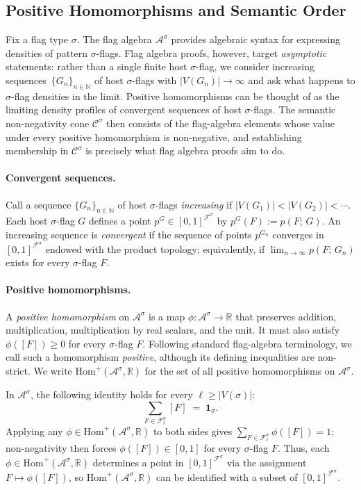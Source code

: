 \documentclass{article}
\newcommand{\poshom}[1]{\mathrm{Hom}^+(\mathcal{A}^{#1}, \mathbb{R})}
\newcommand{\den}[2]{p(#1;\,#2)}
\begin{document}
\subsection{Positive Homomorphisms and Semantic Order}
\label{sec:background-semantic-order}

Fix a flag type $\sigma$.  
The flag algebra $\mathcal{A}^\sigma$ provides algebraic syntax for expressing
densities of pattern $\sigma$-flags.  Flag algebra proofs, however, target
\emph{asymptotic} statements: rather than a single finite host $\sigma$-flag, we
consider increasing sequences~$\{G_n\}_{n\in\mathbb{N}}$ of host
$\sigma$-flags with $|V(G_n)|\to\infty$ and ask what happens to $\sigma$-flag
densities in the limit.  Positive homomorphisms can be thought of as the
limiting density profiles of convergent sequences of host $\sigma$-flags.
The semantic non-negativity cone
$\mathcal{C}^\sigma$ then consists of the flag-algebra elements
whose value under every positive homomorphism is non-negative, and establishing
membership in $\mathcal{C}^\sigma$ is precisely what flag algebra proofs aim
to do.

\paragraph{Convergent sequences.}
Call a sequence $\{G_n\}_{n\in\mathbb{N}}$ of host $\sigma$-flags \emph{increasing} if
$|V(G_1)| < |V(G_2)| < \cdots$.  Each host $\sigma$-flag $G$ defines a point
$p^G \in [0,1]^{\mathcal{F}^\sigma}$ by $p^G(F) := \den{F}{G}$.
An increasing sequence is \emph{convergent} if the sequence of points $p^{G_n}$
converges in $[0,1]^{\mathcal{F}^\sigma}$ endowed with the product topology;
equivalently, if $\lim_{n\to\infty}\den{F}{G_n}$ exists for every $\sigma$-flag $F$.

\paragraph{Positive homomorphisms.}
A \emph{positive homomorphism} on
$\mathcal{A}^\sigma$ is a map
$\phi:\mathcal{A}^\sigma \to \mathbb{R}$ that preserves addition,
multiplication, multiplication by real scalars, and the unit.  It must also
satisfy $\phi([F]) \geq 0$ for every $\sigma$-flag $F$.
Following standard flag-algebra terminology, we call such a homomorphism
\emph{positive}, although its defining inequalities are non-strict.
We write $\poshom{\sigma}$ for the set of all positive homomorphisms on
$\mathcal{A}^\sigma$.

In $\mathcal{A}^\sigma$, the following identity holds for every $\ell \geq |V(\sigma)|$:
\begin{equation}
  \sum_{F \in \mathcal{F}^\sigma_\ell} [F] \;=\; \mathbf{1}_\sigma.
  \label{eq:sum-to-one}
\end{equation}
Applying any $\phi \in \poshom{\sigma}$ to both sides gives
$\sum_{F \in \mathcal{F}^\sigma_\ell} \phi([F]) = 1$;
non-negativity then forces $\phi([F]) \in [0,1]$ for every $\sigma$-flag $F$.
Thus, each $\phi \in \poshom{\sigma}$ determines a point in $[0,1]^{\mathcal{F}^\sigma}$
via the assignment $F \mapsto \phi([F])$, so $\poshom{\sigma}$ can be identified with
a subset of $[0,1]^{\mathcal{F}^\sigma}$.  %
\end{document}
